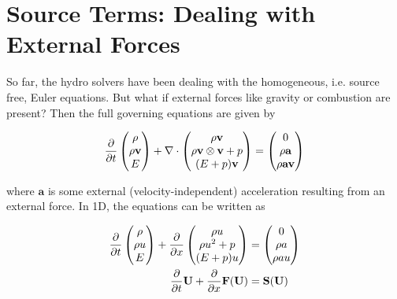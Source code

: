 \newpage
\section{Source Terms: Dealing with External Forces}\label{chap:sources}







So far, the hydro solvers have been dealing with the homogeneous, i.e. source free, Euler equations.
But what if external forces like gravity or combustion are present?
Then the full governing equations are given by

\begin{align}
	\frac{\partial}{\partial t}
	\begin{pmatrix}
		\rho \\
		\rho \mathbf{v} \\
		E
	\end{pmatrix}
	+
	\nabla \cdot
	\begin{pmatrix}
		\rho \mathbf{v}\\
		\rho \mathbf{v} \otimes \mathbf{v} + p\\
		(E + p) \mathbf{v}
	\end{pmatrix}
	=
	\begin{pmatrix}
		0\\
		\rho \mathbf{a}\\
		\rho \mathbf{a} \mathbf{v}
	\end{pmatrix}
\end{align}





where $\mathbf{a}$ is some external (velocity-independent) acceleration resulting from an external force.
In 1D, the equations can be written as


\begin{align}
	\deldt
	\begin{pmatrix}
		\rho \\
		\rho u \\
		E
	\end{pmatrix}
	+
	\deldx
	\begin{pmatrix}
		\rho u\\
		\rho u^2 + p\\
		(E + p) u
	\end{pmatrix}
	&=
	\begin{pmatrix}
		0\\
		\rho a\\
		\rho a u
	\end{pmatrix}
	\\
%
	\deldt \U + \deldx \F(\U) &= \mathbf{S}(\U)
\end{align}





